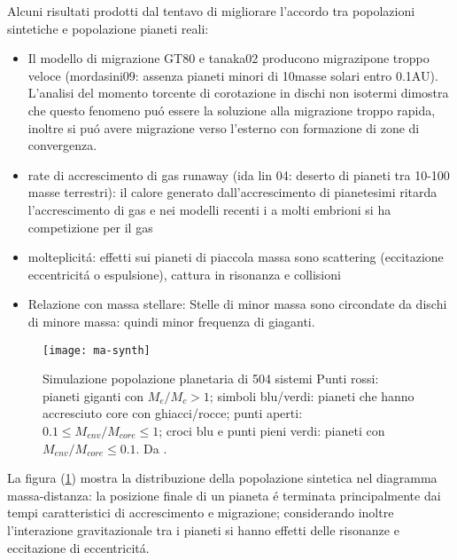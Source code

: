 \begin{workout}
Alcuni risultati prodotti dal tentavo di migliorare l'accordo tra popolazioni sintetiche  e popolazione pianeti reali:
\begin{itemize}
\item Il modello di migrazione GT80 e tanaka02 producono migrazipone troppo veloce (mordasini09: assenza pianeti minori di 10masse solari entro 0.1AU). L'analisi del momento torcente di corotazione in dischi non isotermi dimostra che questo fenomeno pu\'o essere la soluzione alla migrazione troppo rapida, inoltre si pu\'o avere migrazione verso l'esterno con formazione di zone di convergenza.
\item rate di accrescimento di gas runaway (ida lin 04: deserto di pianeti tra 10-100 masse terrestri): il calore generato dall'accrescimento di pianetesimi ritarda l'accrescimento di gas e nei modelli recenti i a molti embrioni si ha competizione per il gas
\item molteplicit\'a: effetti sui pianeti di piaccola massa sono scattering (eccitazione eccentricit\'a o espulsione), cattura in risonanza e collisioni
\item Relazione con massa stellare: Stelle di minor massa sono circondate da dischi di minore massa: quindi minor frequenza di giaganti.%
\end{itemize}
\end{workout}


\begin{figure}[!ht]
\texttt{[image: ma-synth]}
\caption{Simulazione popolazione planetaria di 504 sistemi Punti rossi: pianeti giganti con $M_e/M_c>1$; simboli blu/verdi: pianeti che hanno accresciuto core con ghiacci/rocce; punti aperti: $0.1\leq M_{env}/M_{core}\leq1$; croci blu e punti pieni verdi: pianeti con $M_{env}/M_{core}\leq0.1$. Da \cite{mordasini2018planetary}.}\label{fig:ma-synth}
\end{figure}

La figura (\ref{fig:ma-synth}) mostra la distribuzione della popolazione sintetica nel diagramma massa-distanza: la posizione finale di un pianeta \'e terminata principalmente dai tempi caratteristici di accrescimento e migrazione; considerando inoltre l'interazione gravitazionale tra i pianeti si hanno effetti delle risonanze e eccitazione di eccentricit\'a.

